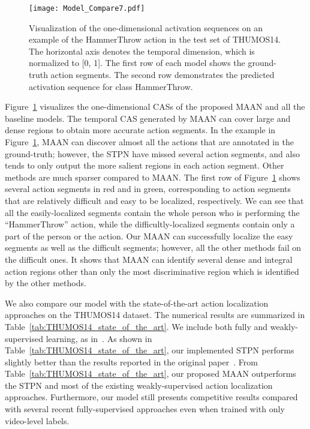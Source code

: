 \documentclass{article} \usepackage{iclr2019_conference,times}
\begin{document}
  \begin{figure}[!t]
  	\begin{center}
  		\texttt{[image: Model\_Compare7.pdf]}
  		\vspace{-5mm}
  		\caption{{Visualization of the one-dimensional activation sequences on an example of the HammerThrow action in the test set of THUMOS14. The horizontal axis denotes the temporal dimension, which is normalized to [0, 1]. The first row of each model shows the ground-truth action segments. The second row demonstrates the predicted activation sequence for class HammerThrow.}}
  		\label{fig:Model_Compare}
  		\vspace{-6mm}
  	\end{center}
  \end{figure}

Figure~\ref{fig:Model_Compare} visualizes the one-dimensional CASs of the proposed MAAN and all the baseline models. The temporal CAS generated by MAAN can cover large and dense regions to obtain more accurate action segments. In the example in Figure~\ref{fig:Model_Compare}, MAAN can discover almost all the actions that are annotated in the ground-truth; however, the STPN have missed several action segments, and also tends to only output the more salient regions in each action segment. Other methods are much sparser compared to MAAN. 
The first row of Figure~\ref{fig:Model_Compare} shows several action segments in red and in green, corresponding to action segments that are relatively difficult and easy to be localized, respectively. We can see that all the easily-localized segments contain the whole person who is performing the ``HammerThrow'' action, while the difficultly-localized segments contain only a part of the person or the action. Our MAAN can successfully localize the easy segments as well as the difficult segments; however, all the other methods fail on the difficult ones. It shows that MAAN can identify several dense and integral action regions other than only the most discriminative region which is identified by the other methods. 

We also compare our model with the state-of-the-art action localization approaches on the THUMOS14 dataset. The numerical results are summarized in Table~\ref{tab:THUMOS14_state_of_the_art}. We include both fully and weakly-supervised learning, as in~\citep{nguyen2017weakly}.  As shown in Table~\ref{tab:THUMOS14_state_of_the_art}, our implemented STPN performs slightly better than the results reported in the original paper~\citep{nguyen2017weakly}. From Table~\ref{tab:THUMOS14_state_of_the_art}, our proposed MAAN outperforms the STPN and most of the existing weakly-supervised action localization approaches.  Furthermore, our model still presents competitive results compared with several recent fully-supervised approaches even when trained with only video-level labels.   
\end{document}
